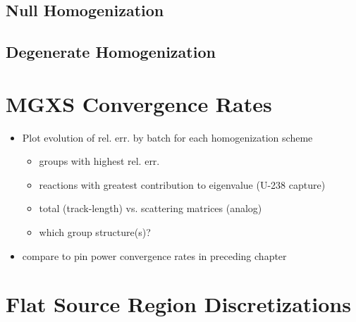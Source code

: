 \subsection{Null Homogenization}
\label{subsec:chap8-null}

\subsection{Degenerate Homogenization}
\label{subsec:chap8-degenerate}


\section{MGXS Convergence Rates}
\label{sec:chap8-mgxs-converge}

\begin{itemize}[noitemsep]
  \item Plot evolution of rel. err. by batch for each homogenization scheme
  \begin{itemize}[noitemsep]
    \item groups with highest rel. err.
    \item reactions with greatest contribution to eigenvalue (U-238 capture)
    \item total (track-length) vs. scattering matrices (analog)    
    \item which group structure(s)?
 \end{itemize}
  \item compare to pin power convergence rates in preceding chapter
\end{itemize}


\section{Flat Source Region Discretizations}
\label{sec:chap8-fsr-discretizations}

